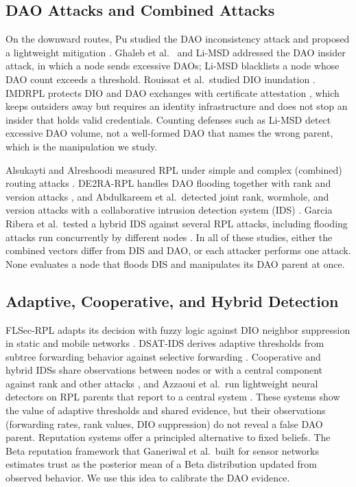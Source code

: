\subsection{DAO Attacks and Combined Attacks}
On the downward routes, Pu studied the DAO inconsistency attack and proposed a lightweight mitigation \cite{pu2018}. Ghaleb et al.\ \cite{ghaleb2019} and Li-MSD \cite{limsd2024} addressed the DAO insider attack, in which a node sends excessive DAOs; Li-MSD blacklists a node whose DAO count exceeds a threshold. Rouissat et al.\ studied DIO inundation \cite{rouissat2023}. IMDRPL protects DIO and DAO exchanges with certificate attestation \cite{imdrpl2023}, which keeps outsiders away but requires an identity infrastructure and does not stop an insider that holds valid credentials. Counting defenses such as Li-MSD detect excessive DAO volume, not a well-formed DAO that names the wrong parent, which is the manipulation we study.

Alsukayti and Alreshoodi measured RPL under simple and complex (combined) routing attacks \cite{alsukayti2023}. DE2RA-RPL handles DAO flooding together with rank and version attacks \cite{de2rarpl2024}, and Abdulkareem et al.\ detected joint rank, wormhole, and version attacks with a collaborative intrusion detection system (IDS) \cite{abdulkareem2024}. Garcia Ribera et al.\ tested a hybrid IDS against several RPL attacks, including flooding attacks run concurrently by different nodes \cite{garciaribera2022}. In all of these studies, either the combined vectors differ from DIS and DAO, or each attacker performs one attack. None evaluates a node that floods DIS and manipulates its DAO parent at once.

\subsection{Adaptive, Cooperative, and Hybrid Detection}
FLSec-RPL adapts its decision with fuzzy logic against DIO neighbor suppression in static and mobile networks \cite{flsecrpl2024}. DSAT-IDS derives adaptive thresholds from subtree forwarding behavior against selective forwarding \cite{dsatids2024}. Cooperative and hybrid IDSs share observations between nodes or with a central component against rank and other attacks \cite{monteiro2026,garciaribera2022}, and Azzaoui et al.\ run lightweight neural detectors on RPL parents that report to a central system \cite{azzaoui2024}. These systems show the value of adaptive thresholds and shared evidence, but their observations (forwarding rates, rank values, DIO suppression) do not reveal a false DAO parent. Reputation systems offer a principled alternative to fixed beliefs. The Beta reputation framework that Ganeriwal et al.\ built for sensor networks \cite{ganeriwal2008} estimates trust as the posterior mean of a Beta distribution updated from observed behavior. We use this idea to calibrate the DAO evidence.

